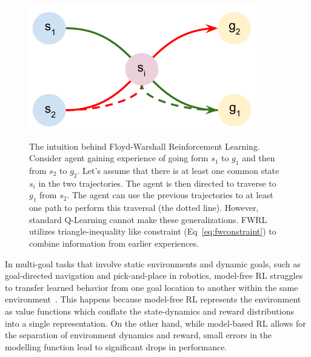 \begin{figure}%
\includegraphics[width=\columnwidth]{./media/optimal_trajectories.pdf}\\
\caption{The intuition behind Floyd-Warshall Reinforcement Learning.
Consider agent gaining experience of going form $s_1$ to $g_1$ and then from
$s_2$ to $g_2$. Let's assume that there is at least one common state $s_i$ in
the two trajectories. The agent is then directed to traverse to $g_1$ from
$s_2$. The agent can use the previous trajectories to at least one path to
perform this traversal (the dotted line). However, standard Q-Learning cannot
make these generalizations. FWRL utilizes triangle-inequality like constraint
(Eq~\eqref{eq:fwconstraint}) to combine information from earlier experiences.
}
\label{fig:ql-fw-grid-world-results}%
\end{figure}

In multi-goal tasks that involve static environments and dynamic goals,
such as goal-directed navigation and pick-and-place in robotics,
model-free RL struggles to transfer learned behavior from one goal
location to another within the same
environment~\citep{dhiman2018critical}. This happens because model-free
RL represents the environment as value functions which conflate the
state-dynamics and reward distributions into a single representation.
On the other hand, while model-based RL allows for the separation of
environment dynamics and reward, small errors in the modelling function
lead to significant drops in performance.

